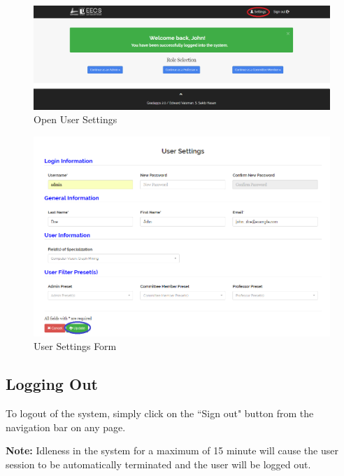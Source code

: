 \documentclass[fontsize=12pt,paper=letter,twoside]{scrartcl}
\begin{document}
\begin{figure}[!htb]
\begin{center}
\includegraphics[width=.99\textwidth]{images/click_settings.png}
\end{center}
\caption{Open User Settings}
\label{fig:click_settings}
\end{figure}

\begin{figure}[!htb]
\begin{center}
\includegraphics[width=.99\textwidth]{images/settings_form.png}
\end{center}
\caption{User Settings Form}
\label{fig:settings_form}
\end{figure}

\clearpage
\subsection{Logging Out}
To logout of the system, simply click on the ``Sign out" button from the navigation bar on any page.

\bigskip
\noindent \textbf{Note:} Idleness in the system for a maximum of 15 minute will cause the user session to be automatically terminated and the user will be logged out.
\end{document}
